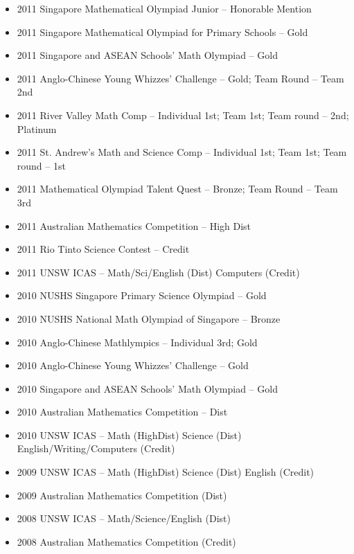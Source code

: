 \documentclass{article}
\begin{document}
{\begin{itemize}
\begin{itemize}
              \item 2011 Singapore Mathematical Olympiad Junior -- Honorable Mention
              \item 2011 Singapore Mathematical Olympiad for Primary Schools -- Gold
              \item 2011 Singapore and ASEAN Schools' Math Olympiad -- Gold
              \item 2011 Anglo-Chinese Young Whizzes' Challenge -- Gold; Team Round -- Team 2nd
              \item 2011 River Valley Math Comp -- Individual 1st; Team 1st; Team round -- 2nd; Platinum
              \item 2011 St. Andrew's Math and Science Comp -- Individual 1st; Team 1st; Team round -- 1st
              \item 2011 Mathematical Olympiad Talent Quest -- Bronze; Team Round -- Team 3rd
              \item 2011 Australian Mathematics Competition -- High Dist
              \item 2011 Rio Tinto Science Contest -- Credit
              \item 2011 UNSW ICAS -- Math/Sci/English (Dist) Computers (Credit)
              \item 2010 NUSHS Singapore Primary Science Olympiad -- Gold
              \item 2010 NUSHS National Math Olympiad of Singapore -- Bronze
              \item 2010 Anglo-Chinese Mathlympics -- Individual 3rd; Gold
              \item 2010 Anglo-Chinese Young Whizzes' Challenge -- Gold
              \item 2010 Singapore and ASEAN Schools' Math Olympiad -- Gold
              \item 2010 Australian Mathematics Competition -- Dist
              \item 2010 UNSW ICAS -- Math (HighDist) Science (Dist) English/Writing/Computers (Credit)
              \item 2009 UNSW ICAS -- Math (HighDist) Science (Dist) English (Credit)
              \item 2009 Australian Mathematics Competition (Dist)
              \item 2008 UNSW ICAS -- Math/Science/English (Dist)
              \item 2008 Australian Mathematics Competition (Credit)
          \end{itemize}
\end{itemize}

}
\end{document}
